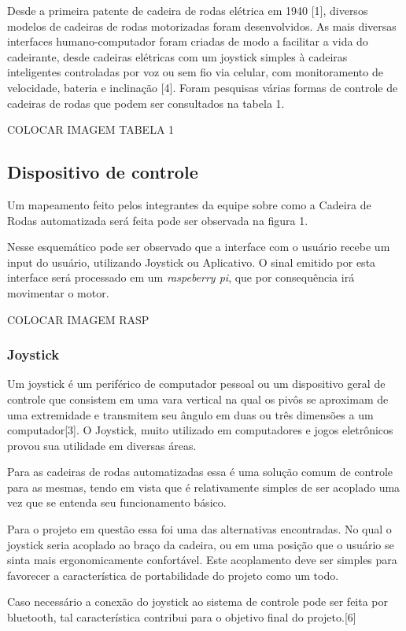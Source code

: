 Desde a primeira patente de cadeira de rodas elétrica em 1940 [1], diversos modelos de cadeiras de rodas motorizadas foram desenvolvidos. As mais diversas interfaces humano-computador foram criadas de modo a facilitar a vida do cadeirante, desde cadeiras elétricas com um joystick simples à cadeiras inteligentes controladas por voz ou sem fio via celular, com monitoramento de velocidade, bateria e inclinação [4]. Foram pesquisas várias formas de controle de cadeiras de rodas que podem ser consultados na tabela 1.

COLOCAR IMAGEM TABELA 1

\subsection{Dispositivo de controle}
Um mapeamento feito pelos integrantes da equipe sobre como a Cadeira de Rodas automatizada será feita pode ser observada na figura 1.

Nesse esquemático pode ser observado que a interface com o usuário recebe um input do usuário, utilizando Joystick ou Aplicativo. O sinal emitido por esta interface será processado em um \textit{raspeberry pi}, que por consequência irá movimentar o motor.

COLOCAR IMAGEM RASP

\subsubsection{Joystick}
Um joystick é um periférico de computador pessoal ou um dispositivo geral de controle que consistem em uma vara vertical na qual os pivôs se aproximam de uma extremidade e transmitem seu ângulo em duas ou três dimensões a um computador[3]. O Joystick, muito utilizado em computadores e jogos eletrônicos provou sua utilidade em diversas áreas.

Para as cadeiras de rodas automatizadas essa é uma solução comum de controle para as mesmas, tendo em vista que é relativamente simples de ser acoplado uma vez que se entenda seu funcionamento básico.

Para o projeto em questão essa foi uma das alternativas encontradas. No qual o joystick seria acoplado ao braço da cadeira, ou em uma posição que o usuário se sinta mais ergonomicamente confortável. Este acoplamento deve ser simples para favorecer a característica de portabilidade do projeto como um todo.

Caso necessário a conexão do joystick ao sistema de controle pode ser feita por bluetooth, tal característica contribui para o objetivo final do projeto.[6]

